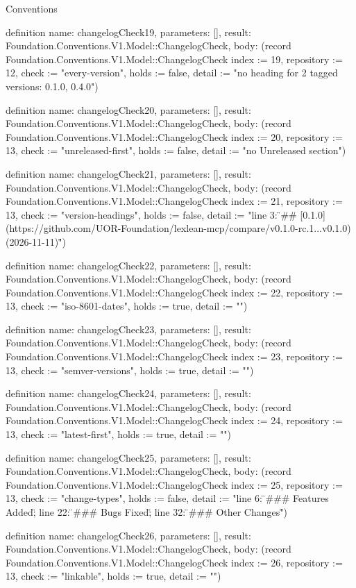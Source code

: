 \begin{lexlean}{Conventions}
\begin{semanticmodule}
definition{
  name: changelogCheck19,
  parameters: [],
  result: Foundation.Conventions.V1.Model::ChangelogCheck,
  body: (record Foundation.Conventions.V1.Model::ChangelogCheck {index := 19, repository := 12, check := "every-version", holds := false, detail := "no heading for 2 tagged versions: 0.1.0, 0.4.0"})
}

definition{
  name: changelogCheck20,
  parameters: [],
  result: Foundation.Conventions.V1.Model::ChangelogCheck,
  body: (record Foundation.Conventions.V1.Model::ChangelogCheck {index := 20, repository := 13, check := "unreleased-first", holds := false, detail := "no Unreleased section"})
}

definition{
  name: changelogCheck21,
  parameters: [],
  result: Foundation.Conventions.V1.Model::ChangelogCheck,
  body: (record Foundation.Conventions.V1.Model::ChangelogCheck {index := 21, repository := 13, check := "version-headings", holds := false, detail := "line 3: \"## [0.1.0](https://github.com/UOR-Foundation/lexlean-mcp/compare/v0.1.0-rc.1...v0.1.0) (2026-11-11)\""})
}

definition{
  name: changelogCheck22,
  parameters: [],
  result: Foundation.Conventions.V1.Model::ChangelogCheck,
  body: (record Foundation.Conventions.V1.Model::ChangelogCheck {index := 22, repository := 13, check := "iso-8601-dates", holds := true, detail := ""})
}

definition{
  name: changelogCheck23,
  parameters: [],
  result: Foundation.Conventions.V1.Model::ChangelogCheck,
  body: (record Foundation.Conventions.V1.Model::ChangelogCheck {index := 23, repository := 13, check := "semver-versions", holds := true, detail := ""})
}

definition{
  name: changelogCheck24,
  parameters: [],
  result: Foundation.Conventions.V1.Model::ChangelogCheck,
  body: (record Foundation.Conventions.V1.Model::ChangelogCheck {index := 24, repository := 13, check := "latest-first", holds := true, detail := ""})
}

definition{
  name: changelogCheck25,
  parameters: [],
  result: Foundation.Conventions.V1.Model::ChangelogCheck,
  body: (record Foundation.Conventions.V1.Model::ChangelogCheck {index := 25, repository := 13, check := "change-types", holds := false, detail := "line 6: \"### Features Added\"; line 22: \"### Bugs Fixed\"; line 32: \"### Other Changes\""})
}

definition{
  name: changelogCheck26,
  parameters: [],
  result: Foundation.Conventions.V1.Model::ChangelogCheck,
  body: (record Foundation.Conventions.V1.Model::ChangelogCheck {index := 26, repository := 13, check := "linkable", holds := true, detail := ""})
}


\end{semanticmodule}
\end{lexlean}
